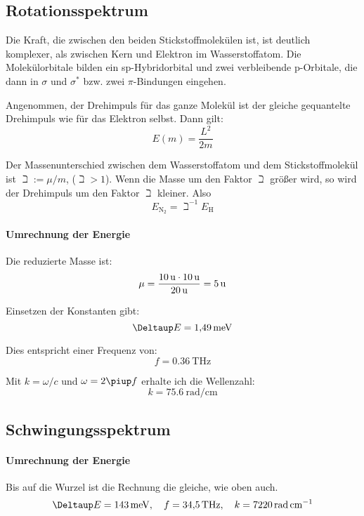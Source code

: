 \subsection{Rotationsspektrum}

Die Kraft, die zwischen den beiden Stickstoffmolekülen ist, ist deutlich komplexer, als zwischen Kern und Elektron im Wasserstoffatom. Die Molekülorbitale bilden ein sp-Hybridorbital und zwei verbleibende p-Orbitale, die dann in $\sigma$ und $\sigma^*$ bzw. zwei $\pi$-Bindungen eingehen.

Angenommen, der Drehimpuls für das ganze Molekül ist der gleiche gequantelte Drehimpuls wie für das Elektron selbst. Dann gilt:
\[
	E(m) = \frac{L^2}{2m}
\]

Der Massenunterschied zwischen dem Wasserstoffatom und dem Stickstoffmolekül ist $\beth := \mu/m$, ($\beth > 1$). Wenn die Masse um den Faktor $\beth$ größer wird, so wird der Drehimpuls um den Faktor $\beth$ kleiner. Also
\[
	E_{\mathrm N_2} = \beth^{-1} E_{\mathrm H}
\]

\paragraph{Umrechnung der Energie}

Die reduzierte Masse ist:
\[
	\mu
	= \frac{\SI{10}\atomicmassunit \cdot \SI{10}\atomicmassunit}{\SI{20}\atomicmassunit}
	= \SI5\atomicmassunit
\]

Einsetzen der Konstanten gibt:
\[
	\Deltaup E = \SI{1.49}{\milli\electronvolt}
\]

Dies entspricht einer Frequenz von:
\[
	f = \SI{0.36}{\tera\hertz}
\]

Mit $k = \omega/c$ und $\omega = 2 \piup f$ erhalte ich die Wellenzahl:
\[
	k = \SI{75.6}{\radian\per\centi\meter}
\]

\subsection{Schwingungsspektrum}

\fehlt

\paragraph{Umrechnung der Energie}

Bis auf die Wurzel ist die Rechnung die gleiche, wie oben auch.
\[
	\Deltaup E = \SI{143}{\milli\electronvolt}
	\eqnsep
	f = \SI{34.5}{\tera\hertz}
	\eqnsep
	k = \SI{7220}{\radian\per\centi\meter}
\]

